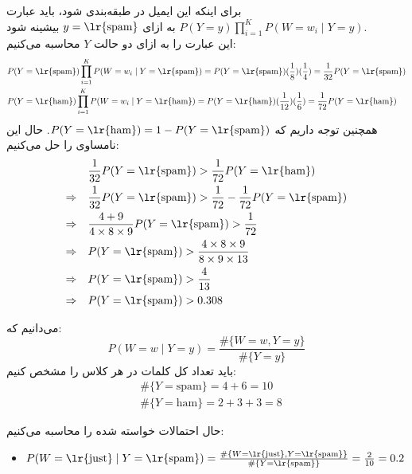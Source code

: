 \question{}

\begin{ابجد}
\item برای اینکه این ایمیل در  طبقه‌بندی شود، باید عبارت $P(Y = y)\prod_{i=1}^{K}P(W = w_i \mid Y = y)$ به ازای $y=\text{\lr{spam}}$ بیشینه شود.\\
این عبارت را به ازای دو حالت $Y$ محاسبه می‌کنیم:
\begin{align*}
     & P(Y = \text{\lr{spam}})\prod_{i=1}^{K}P(W = w_i \mid Y = \text{\lr{spam}}) = P(Y = \text{\lr{spam}})(\frac{1}{8})(\frac{1}{4}) = \frac{1}{32}P(Y = \text{\lr{spam}}) \\
     & P(Y = \text{\lr{ham}})\prod_{i=1}^{K}P(W = w_i \mid Y = \text{\lr{ham}}) = P(Y = \text{\lr{ham}})(\frac{1}{12})(\frac{1}{6}) = \frac{1}{72}P(Y = \text{\lr{ham}})
\end{align*}
همچنین توجه داریم که $P(Y = \text{\lr{ham}}) = 1 - P(Y = \text{\lr{spam}})$. حال این نامساوی را حل می‌کنیم:
\begin{align*}
                      & \frac{1}{32}P(Y = \text{\lr{spam}}) > \frac{1}{72}P(Y = \text{\lr{ham}})                 \\
    \Rightarrow \quad & \frac{1}{32}P(Y = \text{\lr{spam}}) > \frac{1}{72} - \frac{1}{72}P(Y = \text{\lr{spam}}) \\
    \Rightarrow \quad & \frac{4 + 9}{4\times8\times9}P(Y = \text{\lr{spam}}) > \frac{1}{72}                      \\
    \Rightarrow \quad & P(Y = \text{\lr{spam}}) > \frac{4\times8\times9}{8 \times 9 \times 13}                   \\
    \Rightarrow \quad & P(Y = \text{\lr{spam}}) > \frac{4}{13}                                                   \\
    \Rightarrow \quad & P(Y = \text{\lr{spam}}) > 0.308
\end{align*}

\item می‌دانیم که:
\begin{equation*}
    P(W = w \mid Y = y) = \frac{\#\{W = w, Y = y\}}{\#\{Y = y\}}
\end{equation*}
باید تعداد کل کلمات در هر کلاس را مشخص کنیم:
\begin{align*}
     & \#\{Y = \text{spam}\} = 4 + 6 = 10   \\
     & \#\{Y = \text{ham}\} = 2 + 3 + 3 = 8
\end{align*}

حال احتمالات خواسته شده را محاسبه می‌کنیم:
\begin{LTR}
    \begin{itemize}
        \item $P(W = \text{\lr{just}} \mid Y = \text{\lr{spam}}) = \frac{\#\{W = \text{\lr{just}}, Y = \text{\lr{spam}}\}}{\#\{Y = \text{\lr{spam}}\}} = \frac{2}{10} = 0.2$


\end{itemize}
\end{LTR}
\end{ابجد}
